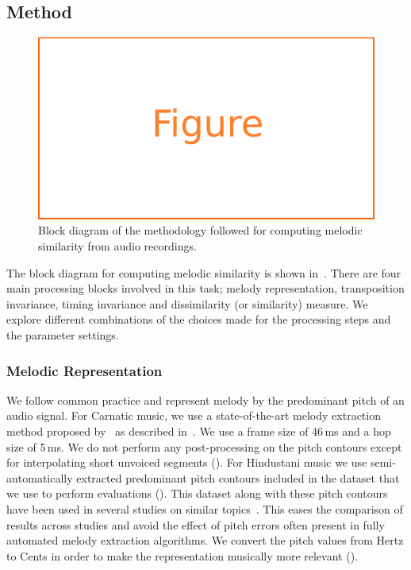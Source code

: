 \subsection{Method}
\label{sec:method_similarity_evaluation}


\begin{figure}
	\begin{center}
		\includegraphics[width=\figSizeEighty]{ch06_patterns/figures/figure_todo.pdf}
	\end{center}
	\caption{Block diagram of the methodology followed for computing melodic similarity from audio recordings.}
	\label{fig:block_diagram_melodic_similarity}
\end{figure}

The block diagram for computing melodic similarity is shown in~. There are four main processing blocks involved in this task; melody representation, transposition invariance, timing invariance and dissimilarity (or similarity) measure. We explore different combinations of the choices made for the processing steps and the parameter settings.

\subsubsection{Melodic Representation}
\label{sec:patterns_melodic_similarity_representation}

We follow common practice and represent melody by the predominant pitch of an audio signal. For Carnatic music, we use a state-of-the-art melody extraction method proposed by~\cite{Salamon2012} as described in~. We use a frame size of 46\,ms and a hop size of 5\,ms. We do not perform any post-processing on the pitch contours except for interpolating short unvoiced segments (). For Hindustani music we use semi-automatically extracted predominant pitch contours included in the dataset that we use to perform evaluations (). This dataset along with these pitch contours have been used in several studies on similar topics~\citep{Rao2014,Ross2012b,Ross2012}. This eases the comparison of results across studies and avoid the effect of pitch errors often present in fully automated melody extraction algorithms. We convert the pitch values from Hertz to Cents in order to make the representation musically more relevant ().

